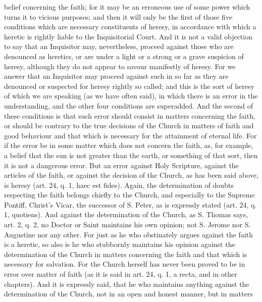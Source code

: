        belief concerning the faith; for it may be an erroneous use of some power which turns it to
       vicious purposes; and then it will only be the first of those five conditions which are
       necessary constituents of heresy, in accordance with which a heretic is rightly liable to the
       Inquisitorial Court.
             And it is not a valid objection to say that an Inquisitor may, nevertheless, proceed
       against those who are denounced as heretics, or are under a light or a strong or a grave
       suspicion of heresy, although they do not appear to savour manifestly of heresy. For we
       answer that an Inquisitor may proceed against such in so far as they are denounced or
       suspected for heresy rightly so called; and this is the sort of heresy of which we are speaking
       (as we have often said), in which there is an error in the understanding, and the other four
       conditions are superadded. And the second of these conditions is that such error should
       consist in matters concerning the faith, or should be contrary to the true decisions of the
       Church in matters of faith and good behaviour and that which is necessary for the attainment
       of eternal life. For if the error be in some matter which does not concern the faith, as, for
       example, a belief that the sun is not greater than the earth, or something of that sort, then it
       is not a dangerous error. But an error against Holy Scripture, against the articles of the faith,
       or against the decision of the Church, as has been said above, is heresy (art. 24, q. 1, haec
       est fides).
             Again, the determination of doubts respecting the faith belongs chiefly to the Church,
       and especially to the Supreme Pontiff, Christ's Vicar, the successor of S. Peter, as is
       expressly stated (art. 24, q. 1, quotiens). And against the determination of the Church, as S.
       Thomas says, art. 2, q. 2, no Doctor or Saint maintains his own opinion; not S. Jerome nor S.
       Augustine nor any other. For just as he who obstinately argues against the faith is a heretic,
       so also is he who stubbornly maintains his opinion against the determination of the Church
       in matters concerning the faith and that which is necessary for salvation. For the Church
       herself has never been proved to be in error over matter of faith (as it is said in art. 24, q. 1,
       a recta, and in other chapters). And it is expressly said, that he who maintains anything
       against the determination of the Church, not in an open and honest manner, but in matters
